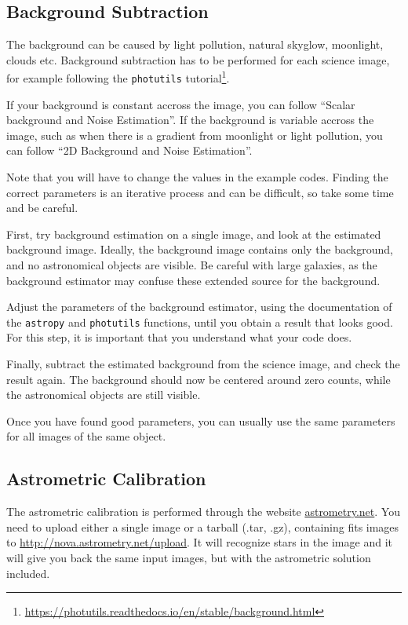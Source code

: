 \documentclass[a4paper, 11pt, fleqn]{memoir}
\begin{document}
\subsection{Background Subtraction}

The background can be caused by light pollution, natural skyglow, moonlight, clouds etc.
Background subtraction has to be performed for each science image, for example following the \texttt{photutils} tutorial\footnote{\url{https://photutils.readthedocs.io/en/stable/background.html}}.

If your background is constant accross the image, you can follow \enquote{Scalar background and Noise Estimation}.
If the background is variable accross the image, such as when there is a gradient from moonlight or light pollution, you can follow \enquote{2D Background and Noise Estimation}.

Note that you will have to change the values in the example codes.
Finding the correct parameters is an iterative process and can be difficult, so take some time and be careful.

First, try background estimation on a single image, and look at the estimated background image.
Ideally, the background image contains only the background, and no astronomical objects are visible.
Be careful with large galaxies, as the background estimator may confuse these extended source for the background.

Adjust the parameters of the background estimator, using the documentation of the \texttt{astropy} and \texttt{photutils} functions, until you obtain a result that looks good.
For this step, it is important that you understand what your code does.

Finally, subtract the estimated background from the science image, and check the result again.
The background should now be centered around zero counts, while the astronomical objects are still visible.

Once you have found good parameters, you can usually use the same parameters for all images of the same object.

\subsection{Astrometric Calibration}

The astrometric calibration is performed through the website \url{astrometry.net}.
You need to upload either a single image or a tarball (.tar, .gz), containing fits images to \url{http://nova.astrometry.net/upload}.
It will recognize stars in the image and it will give you back the same input images, but with the astrometric solution included.
\end{document}
